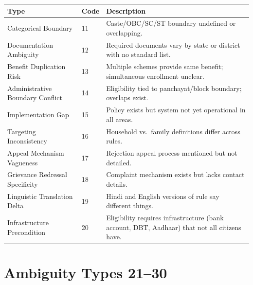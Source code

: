 \documentclass[11pt,a4paper]{report}
\begin{document}
\begin{center}
\small
\begin{tabularx}{\textwidth}{lp{1.2cm}p{6cm}}
\toprule
\textbf{Type} & \textbf{Code} & \textbf{Description} \\
\midrule
Categorical Boundary & 11 & Caste/OBC/SC/ST boundary undefined or overlapping. \\
Documentation Ambiguity & 12 & Required documents vary by state or district with no standard list. \\
Benefit Duplication Risk & 13 & Multiple schemes provide same benefit; simultaneous enrollment unclear. \\
Administrative Boundary Conflict & 14 & Eligibility tied to panchayat/block boundary; overlaps exist. \\
Implementation Gap & 15 & Policy exists but system not yet operational in all areas. \\
Targeting Inconsistency & 16 & Household vs.\ family definitions differ across rules. \\
Appeal Mechanism Vagueness & 17 & Rejection appeal process mentioned but not detailed. \\
Grievance Redressal Specificity & 18 & Complaint mechanism exists but lacks contact details. \\
Linguistic Translation Delta & 19 & Hindi and English versions of rule say different things. \\
Infrastructure Precondition & 20 & Eligibility requires infrastructure (bank account, DBT, Aadhaar) that not all citizens have. \\
\bottomrule
\end{tabularx}
\end{center}

\section{Ambiguity Types 21--30}
\end{document}
